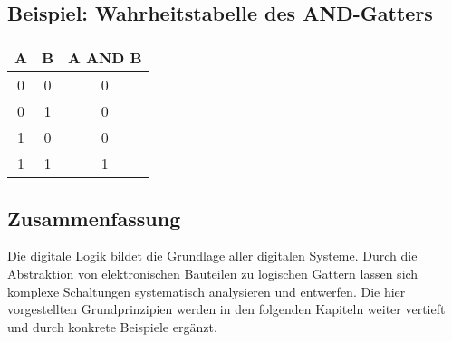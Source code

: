 \subsection{Beispiel: Wahrheitstabelle des AND-Gatters}
\begin{center}
\begin{tabular}{c c | c}
A & B & A AND B \\
\hline
0 & 0 & 0 \\
0 & 1 & 0 \\
1 & 0 & 0 \\
1 & 1 & 1 \\
\end{tabular}
\end{center}

\subsection{Zusammenfassung}
Die digitale Logik bildet die Grundlage aller digitalen Systeme. 
Durch die Abstraktion von elektronischen Bauteilen zu logischen Gattern lassen sich komplexe Schaltungen systematisch analysieren und entwerfen. 
Die hier vorgestellten Grundprinzipien werden in den folgenden Kapiteln weiter vertieft und durch konkrete Beispiele ergänzt.
